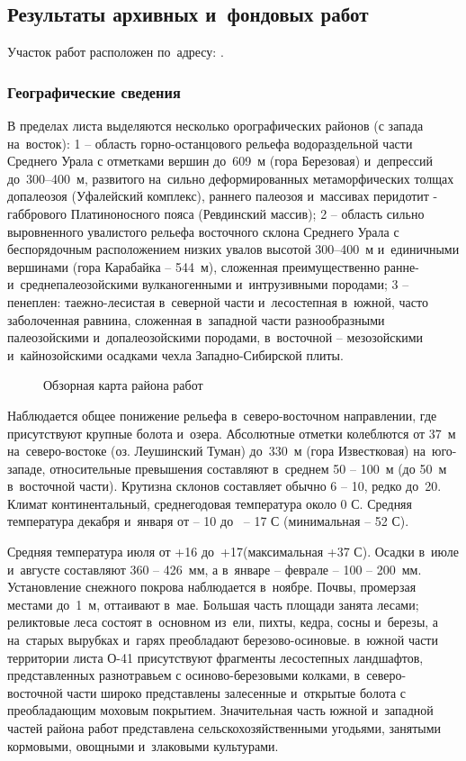 \subsection{Результаты архивных и~фондовых работ}
Участок работ расположен по~адресу: \txtAddress.

\subsubsection{Географические сведения}
В пределах листа {\txtNomenclature} выделяются несколько орографических районов (с запада на~восток): 1 -- область горно-останцового рельефа водораздельной части Среднего Урала с отметками вершин до~609~м (гора Березовая) и~депрессий до~300--400~м, развитого на~сильно деформированных метаморфических толщах допалеозоя (Уфалейский комплекс), раннего палеозоя и~массивах перидотит - габбрового Платиноносного пояса (Ревдинский массив); 2 -- область сильно выровненного увалистого рельефа восточного склона Среднего Урала с беспорядочным расположением низких
увалов высотой 300--400~м и~единичными вершинами (гора Карабайка -- 544~м), сложенная преимущественно ранне- и~среднепалеозойскими вулканогенными и~интрузивными породами; 3  --  пенеплен: таежно-лесистая в~северной части и~лесостепная в~южной, часто заболоченная равнина, сложенная в~западной части разнообразными палеозойскими и~допалеозойскими породами, в~восточной  --  мезозойскими и~кайнозойскими осадками чехла Западно-Сибирской плиты. 
\begin{figure}[h]
	\centering
	\fbox{\texttt{[image: map]}}
	\caption{Обзорная карта района работ}
\end{figure}
Наблюдается общее понижение рельефа в~северо-восточном направлении, где присутствуют крупные болота и~озера. Абсолютные отметки колеблются от 37~м на~северо-востоке (оз. Леушинский Туман) до~330~м (гора Известковая) на~юго-западе, относительные превышения составляют в~среднем 50 -- 100~м (до 50~м в~восточной части). Крутизна склонов составляет обычно 6 -- 10\degree, редко до~20\degree.
Климат континентальный, среднегодовая температура около 0 \degree С. Средняя температура декабря и~января от  -- 10 до~ -- 17 \degree С (минимальная  -- 52 \degree С).

Средняя температура июля от +16 до~+17\degree (максимальная +37 \degree С). Осадки в~июле и~августе составляют 360 -- 426~мм, а в~январе -- феврале  --  100 -- 200~мм.
Установление снежного покрова наблюдается в~ноябре. Почвы, промерзая местами до~1~м, оттаивают в~мае. Большая часть площади занята лесами; реликтовые леса состоят в~основном из~ели, пихты, кедра, сосны и~березы, а на~старых вырубках и~гарях преобладают березово-осиновые. в~южной части территории листа О-41 присутствуют фрагменты лесостепных ландшафтов, представленных разнотравьем с осиново-березовыми колками, в~северо-восточной части широко представлены залесенные и~открытые болота с преобладающим моховым покрытием. Значительная часть южной и~западной частей района работ представлена сельскохозяйственными угодьями, занятыми кормовыми, овощными и~злаковыми культурами. 

